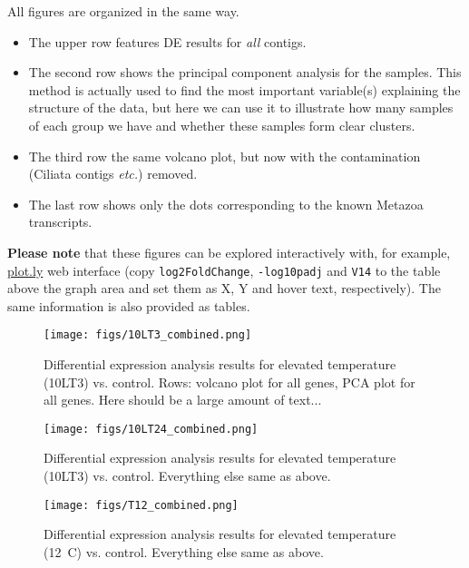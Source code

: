 \documentclass[12pt]{article}
\begin{document}
All figures are organized in the same way. 
\begin{itemize}
\itemsep -3pt
\item The upper row features DE results for \textit{all} contigs.
\item The second row shows the principal component analysis for the samples. This method is actually used to find the most important variable(s) explaining the structure of the data, but here we can use it to  illustrate how many samples of each group we have and whether these samples form clear clusters.
\item The third row the same volcano plot, but now with the contamination (Ciliata contigs \textit{etc.}) removed.
\item The last row shows only the dots corresponding to the known Metazoa transcripts. 
\end{itemize}

\bigskip

\textbf{Please note} that these figures can be explored interactively with, for example, \href{https://plot.ly/create/}{plot.ly} web interface (copy \texttt{log2FoldChange}, \texttt{-log10padj} and \texttt{V14} to the table above the graph area and set them as X, Y and hover text, respectively). The same information is also provided as tables. 



\begin{figure}[H]
\hskip -5mm \texttt{[image: figs/10LT3\_combined.png]}
\caption{Differential expression analysis results for elevated temperature (10LT3) vs. control. Rows: volcano plot for all genes, PCA plot for all genes. Here should be a large amount of text... }
\label{10t3_combined}
\end{figure}


\begin{figure}[H]
\hskip -5mm \texttt{[image: figs/10LT24\_combined.png]}
\caption{Differential expression analysis results for elevated temperature (10LT3) vs. control. Everything else same as above.}
\label{10lt24_combined}
\end{figure}

\begin{figure}[H]
\hskip -5mm \texttt{[image: figs/T12\_combined.png]}
\caption{Differential expression analysis results for elevated temperature (12~\textdegree C) vs. control. Everything else same as above.}
\label{t12_combined}
\end{figure}
\end{document}
